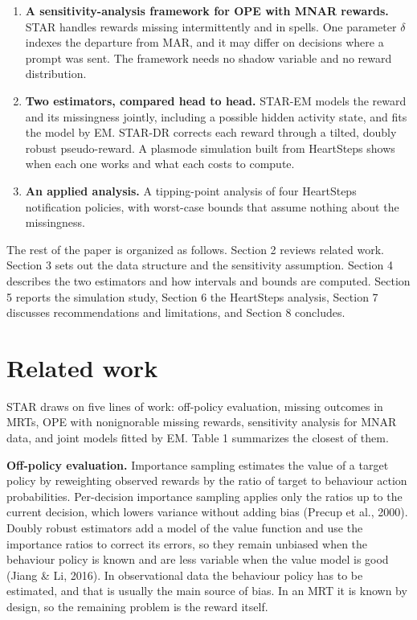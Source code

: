 \documentclass[12pt]{article}
\begin{document}
\begin{enumerate}

\item \textbf{A sensitivity-analysis framework for OPE with MNAR rewards.} STAR handles rewards missing intermittently and in spells. One parameter $\delta$ indexes the departure from MAR, and it may differ on decisions where a prompt was sent. The framework needs no shadow variable and no reward distribution.

\item \textbf{Two estimators, compared head to head.} STAR-EM models the reward and its missingness jointly, including a possible hidden activity state, and fits the model by EM. STAR-DR corrects each reward through a tilted, doubly robust pseudo-reward. A plasmode simulation built from HeartSteps shows when each one works and what each costs to compute.

\item \textbf{An applied analysis.} A tipping-point analysis of four HeartSteps notification policies, with worst-case bounds that assume nothing about the missingness.

\end{enumerate}

The rest of the paper is organized as follows. Section 2 reviews related work. Section 3 sets out the data structure and the sensitivity assumption. Section 4 describes the two estimators and how intervals and bounds are computed. Section 5 reports the simulation study, Section 6 the HeartSteps analysis, Section 7 discusses recommendations and limitations, and Section 8 concludes.

\section{Related work}

STAR draws on five lines of work: off-policy evaluation, missing outcomes in MRTs, OPE with nonignorable missing rewards, sensitivity analysis for MNAR data, and joint models fitted by EM. Table 1 summarizes the closest of them.

\textbf{Off-policy evaluation.} Importance sampling estimates the value of a target policy by reweighting observed rewards by the ratio of target to behaviour action probabilities. Per-decision importance sampling applies only the ratios up to the current decision, which lowers variance without adding bias (Precup et al., 2000). Doubly robust estimators add a model of the value function and use the importance ratios to correct its errors, so they remain unbiased when the behaviour policy is known and are less variable when the value model is good (Jiang \& Li, 2016). In observational data the behaviour policy has to be estimated, and that is usually the main source of bias. In an MRT it is known by design, so the remaining problem is the reward itself.
\end{document}
